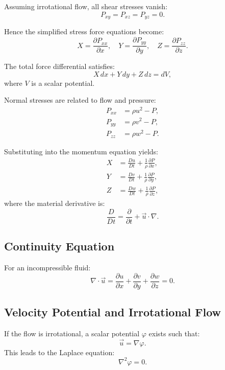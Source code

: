 \documentclass[12pt]{article}
\begin{document}
    Assuming irrotational flow, all shear stresses vanish:
    \begin{equation}
        P_{xy} = P_{xz} = P_{yz} = 0.
    \end{equation}

    Hence the simplified stress force equations become:
    \begin{equation}
        X = \frac{\partial P_{xx}}{\partial x}, \quad
        Y = \frac{\partial P_{yy}}{\partial y}, \quad
        Z = \frac{\partial P_{zz}}{\partial z}.
    \end{equation}

    The total force differential satisfies:
    \begin{equation}
        X\, dx + Y\, dy + Z\, dz = dV,
    \end{equation}
    where \(V\) is a scalar potential.

    Normal stresses are related to flow and pressure:
    \begin{align}
        P_{xx} &= \rho u^2 - P, \\
        P_{yy} &= \rho v^2 - P, \\
        P_{zz} &= \rho w^2 - P.
    \end{align}

    Substituting into the momentum equation yields:
    \begin{align}
        X &= \frac{D u}{D t} + \frac{1}{\rho} \frac{\partial P}{\partial x}, \\
        Y &= \frac{D v}{D t} + \frac{1}{\rho} \frac{\partial P}{\partial y}, \\
        Z &= \frac{D w}{D t} + \frac{1}{\rho} \frac{\partial P}{\partial z},
    \end{align}
    where the material derivative is:
    \begin{equation}
        \frac{D}{D t} = \frac{\partial}{\partial t} + \vec{u} \cdot \nabla.
    \end{equation}

    \subsection*{Continuity Equation}
    For an incompressible fluid:
    \begin{equation}
        \nabla \cdot \vec{u} = \frac{\partial u}{\partial x} + \frac{\partial v}{\partial y} + \frac{\partial w}{\partial z} = 0.
    \end{equation}

    \subsection*{Velocity Potential and Irrotational Flow}
    If the flow is irrotational, a scalar potential \(\varphi\) exists such that:
    \begin{equation}
        \vec{u} = \nabla \varphi.
    \end{equation}
    This leads to the Laplace equation:
    \begin{equation}
        \nabla^2 \varphi = 0.
    \end{equation}
\end{document}

